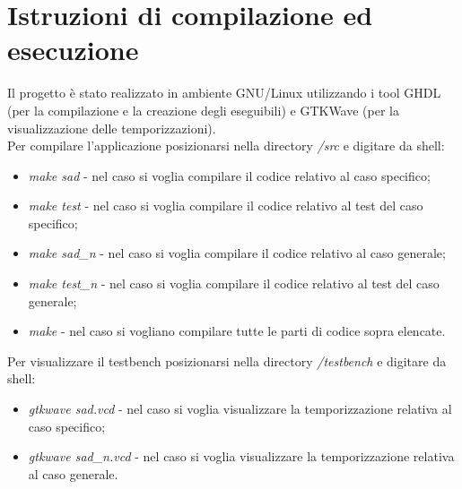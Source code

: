 \documentclass[12pt, a4paper]{article}
\begin{document}
\section{Istruzioni di compilazione ed esecuzione}
Il progetto è stato realizzato in ambiente GNU/Linux utilizzando i tool GHDL (per la compilazione e la creazione degli eseguibili) e GTKWave (per la visualizzazione delle temporizzazioni).\\
Per compilare l'applicazione posizionarsi nella directory \textit{/src} e digitare da shell:
\begin{itemize}
\item
\textit{make sad }- nel caso si voglia compilare il codice relativo al caso specifico;
\item
\textit{make test} - nel caso si voglia compilare il codice relativo al test del caso specifico;
\item
\textit{make sad\_n }- nel caso si voglia compilare il codice relativo al caso generale;
\item
\textit{make test\_n} - nel caso si voglia compilare il codice relativo al test del caso generale;
\item
\textit{make} - nel caso si vogliano compilare tutte le parti di codice sopra elencate. 
\end{itemize}
Per visualizzare il testbench posizionarsi nella directory \textit{/testbench} e digitare da shell:
\begin{itemize}
\item 
\textit{gtkwave sad.vcd} - nel caso si voglia visualizzare la temporizzazione relativa al caso specifico;
\item
\textit{gtkwave sad\_n.vcd} - nel caso si voglia visualizzare la temporizzazione relativa al caso generale.
\end{itemize}
\end{document}
